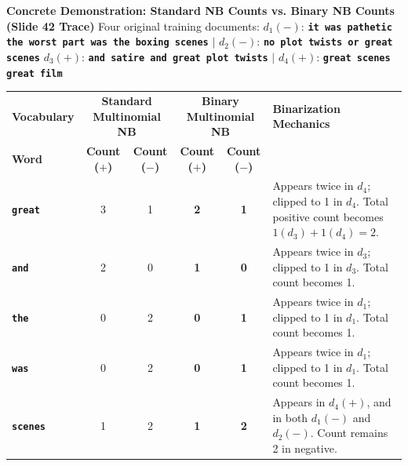 \documentclass[10pt,a4paper]{article}
\newcommand{\rx}[1]{\texttt{\bfseries\color{inlinecode}#1}}
\begin{document}
\begin{examplebox}
\footnotesize
\textbf{Concrete Demonstration: Standard NB Counts vs. Binary NB Counts (Slide 42 Trace)}
\newline Four original training documents:
$d_1 (-)$: \rx{it was pathetic the worst part was the boxing scenes} \quad$\vert$\quad
$d_2 (-)$: \rx{no plot twists or great scenes}
\newline $d_3 (+)$: \rx{and satire and great plot twists} \quad$\vert$\quad
$d_4 (+)$: \rx{great scenes great film}

\vspace{1pt}
\noindent\begin{tabularx}{\textwidth}{l cc cc >{\raggedright\arraybackslash}X}
\toprule
\rowcolor{lightbg}
\textbf{Vocabulary} & \multicolumn{2}{c}{\textbf{Standard Multinomial NB}} & \multicolumn{2}{c}{\textbf{Binary Multinomial NB}} & \textbf{Binarization Mechanics} \\
\rowcolor{lightbg}
\textbf{Word} & \textbf{Count ($+$)} & \textbf{Count ($-$)} & \textbf{Count ($+$)} & \textbf{Count ($-$)} & \\
\midrule
\rx{great} & 3 & 1 & \textbf{2} & \textbf{1} & Appears twice in $d_4$; clipped to 1 in $d_4$. Total positive count becomes $1(d_3) + 1(d_4) = 2$. \\
\rx{and} & 2 & 0 & \textbf{1} & \textbf{0} & Appears twice in $d_3$; clipped to 1 in $d_3$. Total count becomes 1. \\
\rx{the} & 0 & 2 & \textbf{0} & \textbf{1} & Appears twice in $d_1$; clipped to 1 in $d_1$. Total count becomes 1. \\
\rx{was} & 0 & 2 & \textbf{0} & \textbf{1} & Appears twice in $d_1$; clipped to 1 in $d_1$. Total count becomes 1. \\
\rx{scenes} & 1 & 2 & \textbf{1} & \textbf{2} & Appears in $d_4 (+)$, and in both $d_1 (-)$ and $d_2 (-)$. Count remains 2 in negative. \\
\bottomrule
\end{tabularx}
\end{examplebox}

\vspace{-2pt}
\end{document}

